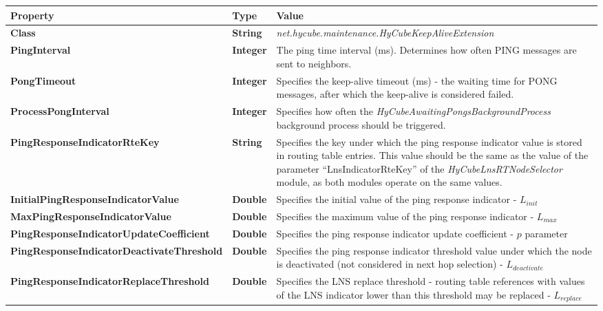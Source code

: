 \begin{table}
\scriptsize
\begin{center}
\begin{tabular}{p{5.5cm} p{1.0cm} p{8.0cm}}
	\hline
	\textbf{Property}										& \textbf{Type}					& \textbf{Value}					\\[1mm]
    \hline
	\textbf{Class}											& \textbf{String}				& \textit{net.hycube.maintenance.HyCubeKeepAliveExtension}										\\[1.5mm]	
	\textbf{PingInterval}									& \textbf{Integer}				& The ping time interval (ms). Determines how often PING messages are sent to neighbors.		\\[1.5mm]	
	\textbf{PongTimeout}									& \textbf{Integer}				& Specifies the keep-alive timeout (ms) - the waiting time for PONG messages, after which the keep-alive is considered failed.	\\[1.5mm]	
	\textbf{ProcessPongInterval}							& \textbf{Integer}				& Specifies how often the \emph{HyCubeAwaitingPongsBackgroundProcess} background process should be triggered.	\\[1.5mm]	
	\textbf{PingResponseIndicatorRteKey}					& \textbf{String}				& Specifies the key under which the ping response indicator value is stored in routing table entries. This value should be the same as the value of the parameter ``LnsIndicatorRteKey'' of the \emph{HyCubeLnsRTNodeSelector} module, as both modules operate on the same values.		\\[1.5mm]	
	\textbf{InitialPingResponseIndicatorValue}				& \textbf{Double}				& Specifies the initial value of the ping response indicator - $L_{init}$		\\[1.5mm]	
	\textbf{MaxPingResponseIndicatorValue}					& \textbf{Double}				& Specifies the maximum value of the ping response indicator - $L_{max}$			\\[1.5mm]	
	\textbf{PingResponseIndicatorUpdateCoefficient}			& \textbf{Double}				& Specifies the ping response indicator update coefficient - $p$ parameter		\\[1.5mm]	
	\textbf{PingResponseIndicatorDeactivateThreshold}		& \textbf{Double}				& Specifies the ping response indicator threshold value under which the node is deactivated (not considered in next hop selection) - $L_{deactivate}$	\\[1.5mm]	
	\textbf{PingResponseIndicatorReplaceThreshold}			& \textbf{Double}				& Specifies the LNS replace threshold - routing table references with values of the LNS indicator lower than this threshold may be replaced - $L_{replace}$		\\[1.5mm]	

\end{tabular}
\end{center}
\end{table}
